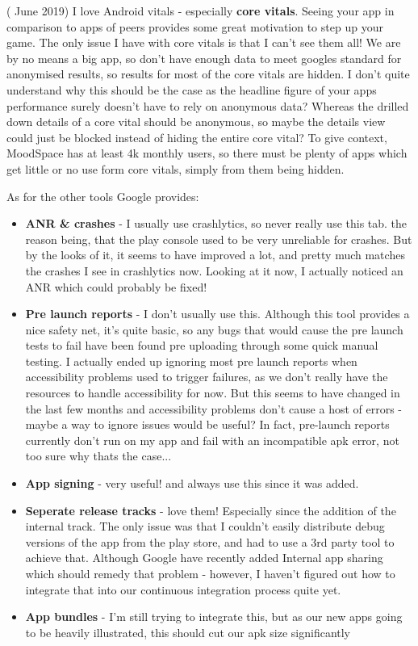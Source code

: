 ( June 2019)
I love Android vitals - especially \textbf{core vitals}. Seeing your app in comparison to apps of peers provides some great motivation to step up your game. The only issue I have with core vitals is that I can't see them all! We are by no means a big app, so don't have enough data to meet googles standard for anonymised results, so results for most of the core vitals are hidden. I don't quite understand why this should be the case as the headline figure of your apps performance surely doesn't have to rely on anonymous data? Whereas the drilled down details of a core vital should be anonymous, so maybe the details view could just be blocked instead of hiding the entire core vital? To give context, MoodSpace has at least 4k monthly users, so there must be plenty of apps which get little or no use form core vitals, simply from them being hidden.

As for the other tools Google provides:
\begin{itemize}
    \item \textbf{ANR \& crashes} - I usually use crashlytics, so never really use this tab. the reason being, that the play console used to be very unreliable for crashes. But by the looks of it, it seems to have improved a lot, and pretty much matches the crashes I see in crashlytics now. Looking at it now, I actually noticed an ANR which could probably be fixed!
    \item \textbf{Pre launch reports} - I don't usually use this. Although this tool provides a nice safety net, it's quite basic, so any bugs that would cause the pre launch tests to fail have been found pre uploading through some quick manual testing. I actually ended up ignoring most pre launch reports when accessibility problems used to trigger failures, as we don't really have the resources to handle accessibility for now. But this seems to have changed in the last few months and accessibility problems don't cause a host of errors - maybe a way to ignore issues would be useful? In fact, pre-launch reports currently don't run on my app and fail with an incompatible apk error, not too sure why thats the case...
    \item \textbf{App signing} - very useful! and always use this since it was added.
    \item \textbf{Seperate release tracks} - love them! Especially since the addition of the internal track. The only issue was that I couldn't easily distribute debug versions of the app from the play store, and had to use a 3rd party tool to achieve that. Although Google have recently added Internal app sharing which should remedy that problem - however, I haven't figured out how to integrate that into our continuous integration process quite yet.
    \item \textbf{App bundles} - I'm still trying to integrate this, but as our new apps going to be heavily illustrated, this should cut our apk size significantly
\end{itemize}

